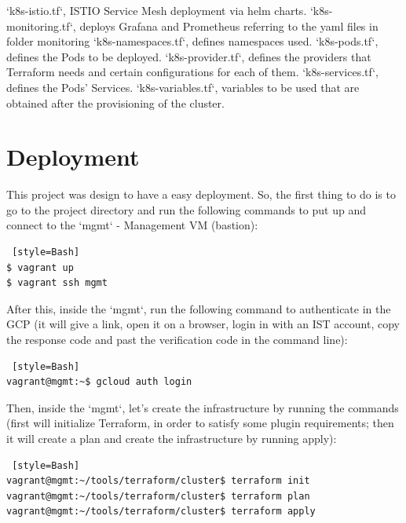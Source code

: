 \documentclass[12pt,a4paper,oneside]{report}
\begin{document}
\begin{itemize}
\begin{itemize}
\begin{itemize}
\begin{itemize}
                    \end{itemize}
                \subitem `k8s-istio.tf`, ISTIO Service Mesh deployment via helm charts.
                \subitem `k8s-monitoring.tf`, deploys Grafana and Prometheus referring to the yaml files in folder monitoring
                \subitem `k8s-namespaces.tf`, defines namespaces used.
                \subitem `k8s-pods.tf`, defines the Pods to be deployed.
                \subitem `k8s-provider.tf`, defines the providers that Terraform needs and certain configurations for each of them.
                \subitem `k8s-services.tf`, defines the Pods' Services.
                \subitem `k8s-variables.tf`, variables to be used that are obtained after the provisioning of the cluster.
        \end{itemize}
    \end{itemize}
\end{itemize}

\cleardoublepage
\chapter{Deployment}
\label{chapter:deployment}
This project was design to have a easy deployment. So, the first thing to do is to go to the project directory and run the following commands to put up and connect to the `mgmt` - Management \ac{VM} (bastion):

\begin{lstlisting} [style=Bash]
$ vagrant up
$ vagrant ssh mgmt
\end{lstlisting}

After this, inside the `mgmt`, run the following command to authenticate in the \ac{GCP} (it will give a link, open it on a browser, login in with an IST account, copy the response code and past the verification code in the command line):

\begin{lstlisting} [style=Bash]
vagrant@mgmt:~$ gcloud auth login
\end{lstlisting}

Then, inside the `mgmt`, let's create the infrastructure by running the commands (first will initialize Terraform, in order to satisfy some plugin requirements; then it will create a plan and create the infrastructure by running apply):

\begin{lstlisting} [style=Bash]
vagrant@mgmt:~/tools/terraform/cluster$ terraform init
vagrant@mgmt:~/tools/terraform/cluster$ terraform plan
vagrant@mgmt:~/tools/terraform/cluster$ terraform apply
\end{lstlisting}
\end{document}
